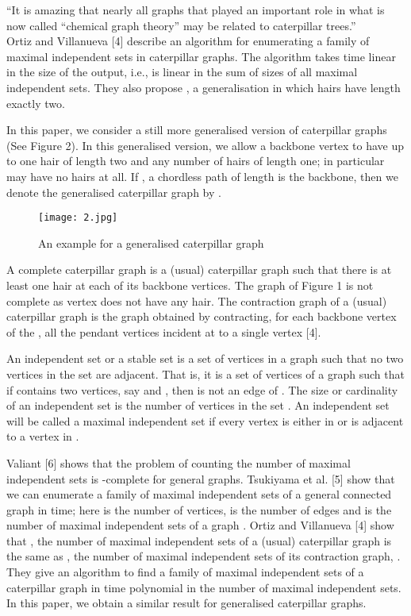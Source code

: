 \documentclass[10pt]{article}
\begin{document}
``It is amazing that nearly all graphs that played an important role in
what is now called ``chemical graph theory'' may be related to
caterpillar trees.'' \\


Ortiz and Villanueva [4] describe an algorithm for enumerating a family
of maximal independent sets in caterpillar graphs. The algorithm takes
time linear in the size of the output, i.e., is linear in the sum of
sizes of all maximal independent sets.  They also propose , a
generalisation in which hairs have length exactly two. 

In this paper, we consider a still more generalised version of
caterpillar graphs (See Figure 2).  In this generalised version, we allow
a backbone vertex  to have up to one hair of length two and any
number of hairs of length one; in particular  may have no hairs at
all.  If , a chordless path of length  is the
backbone, then we denote the generalised caterpillar graph by
.

\begin{figure}[h]
\centering 
\texttt{[image: 2.jpg]} 
\caption{An example for a generalised caterpillar graph}
\end{figure} 

A complete caterpillar graph  is a (usual) caterpillar graph
such that there is at least one hair at each of its backbone vertices.
The graph of Figure 1 is not complete as vertex  does not have any
hair. The contraction graph  of a (usual) caterpillar graph 
is the graph obtained by contracting, for each backbone vertex  of
the , all the pendant vertices incident at  to a single
vertex [4].

An independent set or a stable set is a set of vertices in a graph such
that no two vertices in the set are adjacent. That is, it is a set  of
vertices of a graph  such that if  contains two vertices, say 
and , then  is not an edge of . The size or cardinality of an
independent set  is the number of vertices in the set . An
independent set  will be called a maximal independent set if every
vertex  is either in  or is adjacent to a vertex in .

Valiant [6] shows that the problem of counting the number of maximal
independent sets is -complete for general graphs. Tsukiyama et al.
[5] show that we can enumerate a family of maximal independent sets of a
general connected graph in  time; here  is the number of
vertices,  is the number of edges and  is the number of maximal
independent sets of a graph . Ortiz and Villanueva [4] show that
, the number of maximal independent sets of a (usual)
caterpillar graph  is the same as , the number of maximal
independent sets of its contraction graph, .  They give an algorithm
to find a family of maximal independent sets of a caterpillar graph in
time polynomial in the number of maximal independent sets. In this paper,
we obtain a similar result for generalised caterpillar graphs. 
\end{document}
